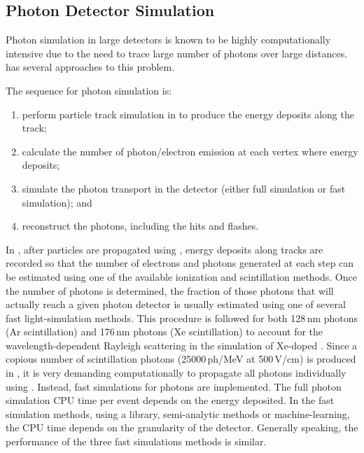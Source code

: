 \documentclass[../main-v1.tex]{subfiles}
\begin{document}
\subsection{Photon Detector Simulation }

Photon simulation in large detectors is known to be highly computationally intensive due to the need to trace large number of photons over large distances.   has several approaches to this problem. 

The sequence for photon simulation is:
\begin{enumerate}
\item perform particle track simulation in  to produce the energy deposits along the track;
\item  calculate the number of photon/electron emission at each vertex where energy deposits; \item 
simulate the photon transport in the detector (either full simulation or fast simulation); and
\item  reconstruct the photons, including the hits and flashes. %
\end{enumerate}
 
In , after particles are propagated using , energy deposits along tracks are recorded so that the number of electrons and photons generated at each step can be estimated using one of the available  ionization and scintillation methods. Once the number of photons is determined, the fraction of those photons that will actually reach a given photon detector is usually estimated using one of several fast light-simulation methods. This procedure is followed for both 128\,nm photons (Ar scintillation) and 176\,nm photons (Xe scintillation) to account for the wavelength-dependent Rayleigh scattering in the simulation of Xe-doped . 
Since a copious number of scintillation photons (25000\,ph/MeV at 500\,V/cm) is produced in , it is very demanding computationally to propagate all photons individually using . Instead,  fast simulations for photons are implemented.
The full   photon simulation CPU time per event depends on the energy deposited. 
In the fast simulation methods, using a library,  semi-analytic methods or machine-learning, the CPU time depends on the granularity of the detector. Generally speaking, the performance of the three fast simulations methods is similar. %
 
\end{document}
